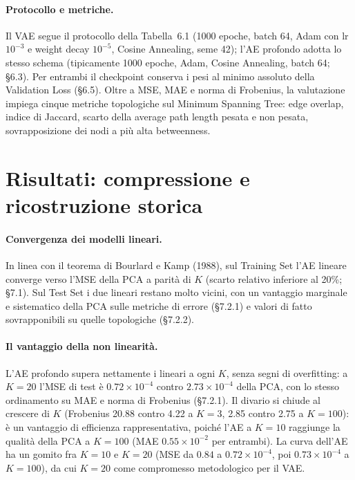 \paragraph{Protocollo e metriche.} Il VAE segue il protocollo della Tabella~6.1 (1000 epoche, batch 64, Adam con lr $10^{-3}$ e weight decay $10^{-5}$, Cosine Annealing, seme 42); l'AE profondo adotta lo stesso schema (tipicamente 1000 epoche, Adam, Cosine Annealing, batch 64; \S6.3). Per entrambi il checkpoint conserva i pesi al minimo assoluto della Validation Loss (\S6.5). Oltre a MSE, MAE e norma di Frobenius, la valutazione impiega cinque metriche topologiche sul Minimum Spanning Tree: edge overlap, indice di Jaccard, scarto della average path length pesata e non pesata, sovrapposizione dei nodi a più alta betweenness.

\section{Risultati: compressione e ricostruzione storica}

\paragraph{Convergenza dei modelli lineari.} In linea con il teorema di Bourlard e Kamp (1988), sul Training Set l'AE lineare converge verso l'MSE della PCA a parità di $K$ (scarto relativo inferiore al 20\%; \S7.1). Sul Test Set i due lineari restano molto vicini, con un vantaggio marginale e sistematico della PCA sulle metriche di errore (\S7.2.1) e valori di fatto sovrapponibili su quelle topologiche (\S7.2.2).

\paragraph{Il vantaggio della non linearità.} L'AE profondo supera nettamente i lineari a ogni $K$, senza segni di overfitting: a $K = 20$ l'MSE di test è $0.72 \times 10^{-4}$ contro $2.73 \times 10^{-4}$ della PCA, con lo stesso ordinamento su MAE e norma di Frobenius (\S7.2.1). Il divario si chiude al crescere di $K$ (Frobenius 20.88 contro 4.22 a $K = 3$, 2.85 contro 2.75 a $K = 100$): è un vantaggio di efficienza rappresentativa, poiché l'AE a $K = 10$ raggiunge la qualità della PCA a $K = 100$ (MAE $0.55 \times 10^{-2}$ per entrambi). La curva dell'AE ha un gomito fra $K = 10$ e $K = 20$ (MSE da $0.84$ a $0.72 \times 10^{-4}$, poi $0.73 \times 10^{-4}$ a $K = 100$), da cui $K = 20$ come compromesso metodologico per il VAE.

